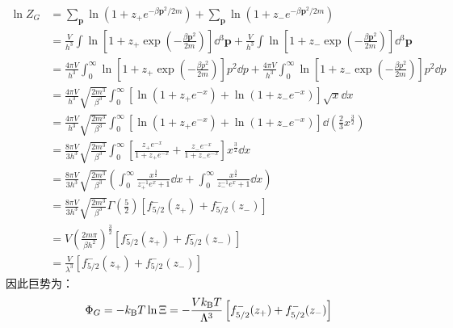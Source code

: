 \[\begin{aligned}
\ln Z_G&=\sum_{\mathbf p}\ln\left(1+z_+e^{-\beta\mathbf p^2/2m}\right)+\sum_{\mathbf p}\ln\left(1+z_-e^{-\beta\mathbf p^2/2m}\right)\\
&=\frac{V}{h^3}\int\ln\left[1+z_+\exp\left(-\frac{\beta\mathbf{p}^2}{2m}\right)\right]\dd{^3\mathbf{p}}+\frac{V}{h^3}\int\ln\left[1+z_-\exp\left(-\frac{\beta\mathbf{p}^2}{2m}\right)\right]\dd{^3\mathbf{p}}\\
&=\frac{4\pi V}{h^3}\int_0^{\infty}\ln\left[1+z_+\exp\left(-\frac{\beta p^2}{2m}\right)\right]p^2\dd{p}+\frac{4\pi V}{h^3}\int_0^{\infty}\ln\left[1+z_-\exp\left(-\frac{\beta p^2}{2m}\right)\right]p^2\dd{p}\\
&=\frac{4\pi V}{h^3}\sqrt{\frac{2m^3}{\beta^3}}\int_0^{\infty}\left[\ln\left(1+z_+e^{-x}\right)+\ln\left(1+z_-e^{-x}\right)\right]\sqrt{x}\dd{x}\\
&=\frac{4\pi V}{h^3}\sqrt{\frac{2m^3}{\beta^3}}\int_0^{\infty}\left[\ln\left(1+z_+e^{-x}\right)+\ln\left(1+z_-e^{-x}\right)\right]\dd{\left(\frac{2}{3}x^{\frac{3}{2}}\right)}\\
&=\frac{8\pi V}{3h^3}\sqrt{\frac{2m^3}{\beta^3}}\int_0^{\infty}\left[\frac{z_+e^{-x}}{1+z_+e^{-x}}+\frac{z_-e^{-x}}{1+z_-e^{-x}}\right]x^{\frac{3}{2}}\dd{x}\\
&=\frac{8\pi V}{3h^3}\sqrt{\frac{2m^3}{\beta^3}}\left(\int_0^{\infty}\frac{x^{\frac{3}{2}}}{z_+^{-1}e^x+1}\dd{x}+\int_0^{\infty}\frac{x^{\frac{3}{2}}}{z_-^{-1}e^x+1}\dd{x}\right)\\
&=\frac{8\pi V}{3h^3}\sqrt{\frac{2m^3}{\beta^3}}\Gamma\left(\frac{5}{2}\right)\left[f_{5/2}^-(z_+)+f_{5/2}^-(z_-)\right]\\
&=V\left(\frac{2m\pi}{\beta h^2}\right)^\frac{3}{2}\left[f_{5/2}^-(z_+)+f_{5/2}^-(z_-)\right]\\
&=\frac{V}{\lambda^3}\left[f_{5/2}^-(z_+)+f_{5/2}^-(z_-)\right]
\end{aligned}\]
因此巨势为：
\[\Phi_G=-k_{\rm B}T\ln\Xi=-\frac{Vk_{\rm B}T}{\Lambda^3}\left[f_{5/2}^-(z_+)+f_{5/2}^-(z_-)\right]\]

